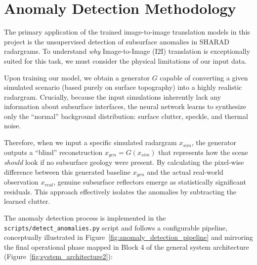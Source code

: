 \section{Anomaly Detection Methodology}
\label{sec:anomaly_detection_methodology}
The primary application of the trained image-to-image translation models in this project is the unsupervised detection of subsurface anomalies in SHARAD radargrams.
To understand \textit{why} Image-to-Image (I2I) translation is exceptionally suited for this task, we must consider the physical limitations of our input data.

Upon training our model, we obtain a generator $G$ capable of converting a given simulated scenario (based purely on surface topography) into a highly realistic radargram.
Crucially, because the input simulations inherently lack any information about subsurface interfaces, the neural network learns to synthesize only the \enquote{normal} background distribution: surface clutter, speckle, and thermal noise.


Therefore, when we input a specific simulated radargram $x_{sim}$, the generator outputs a \enquote{blind} reconstruction $x_{gen} = G(x_{sim})$ that represents how the scene \textit{should} look if no subsurface geology were present.
By calculating the pixel-wise difference between this generated baseline $x_{gen}$ and the actual real-world observation $x_{real}$, genuine subsurface reflectors emerge as statistically significant residuals.
This approach effectively isolates the anomalies by subtracting the learned clutter.

The anomaly detection process is implemented in the \texttt{scripts/detect\_anomalies.py} script and follows a configurable pipeline, conceptually illustrated in Figure~\ref{fig:anomaly_detection_pipeline} and mirroring the final operational phase mapped in Block 4 of the general system architecture (Figure~\ref{fig:system_architecture2}):

